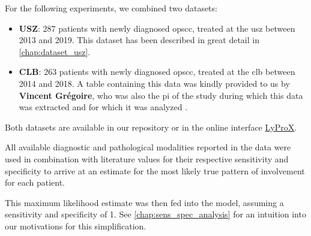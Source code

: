 \begin{tcolorbox}[title=\faIcon{database} Data, parbox=false]
    For the following experiments, we combined two datasets:

    \begin{itemize}[leftmargin=7mm]
        \item[\faIcon{hospital}] \textbf{USZ}: 287 patients with newly diagnosed \gls{opscc}, treated at the \acrlong{usz} between 2013 and 2019. This dataset has been described in great detail in \cref{chap:dataset_usz}.
        \item[\faIcon{hospital}] \textbf{CLB}: 263 patients with newly diagnosed \gls{opscc}, treated at the \acrlong{clb} between 2014 and 2018. A table containing this data was kindly provided to us by \textbf{Vincent Grégoire}, who was also the \gls{pi} of the study during which this data was extracted and for which it was analyzed \cite{bauwens_prevalence_2021}.
    \end{itemize}

    Both datasets are available in our repository  or in the online interface \href{https://lyprox.org/patients/dataset/}{ LyProX}.

    All available diagnostic and pathological modalities reported in the data were used in combination with literature values for their respective sensitivity and specificity \cite{de_bondt_detection_2007} to arrive at an estimate for the most likely true pattern of involvement for each patient.

    This maximum likelihood estimate was then fed into the model, assuming a sensitivity and specificity of 1. See \cref{chap:sens_spec_analysis} for an intuition into our motivations for this simplification.
\end{tcolorbox}
